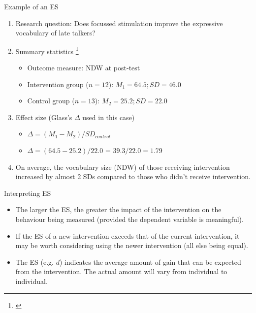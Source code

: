 \documentclass{beamer}
\begin{document}
% 
\begin{frame}{Example of an ES}
	\begin{enumerate}
	\item Research question: Does focussed stimulation improve the expressive vocabulary of late talkers? 
	\item Summary statistics \footnote{\tiny{\citet{Girolametto1996}}}
		\begin{itemize}
		\item Outcome measure: NDW at post-test 
		\item Intervention group ($n = 12$): $M_1 = 64.5; SD = 46.0$
		\item Control group ($n = 13$): $M_2 = 25.2; SD = 22.0$
		\end{itemize}
	\item Effect size (Glass's $\Delta$ used in this case)
		\begin{itemize}
		\item $\Delta = (M_1 - M_2) / SD_{control}$
		\item $\Delta = (64.5 - 25.2) / 22.0$
		= $39.3 / 22.0 = 1.79$ 
		\end{itemize}
	\item \alert{On average,} the vocabulary size (NDW) of those receiving intervention increased by almost 2 SDs compared to those who didn't receive intervention.
	\end{enumerate}
\end{frame}

% 
\begin{frame}{Interpreting ES}
	\begin{itemize}
	\item The larger the ES, the greater the impact of the intervention on the behaviour being measured (provided the dependent variable is meaningful).
	\item If the ES of a new intervention exceeds that of the current intervention, it may be worth considering using the newer intervention (all else being equal). 
	\item The ES (e.g. $d$) indicates the \alert{average} amount of gain that can be expected from the intervention. The actual amount will vary from individual to individual.
	\end{itemize}
\end{frame}
\end{document}
